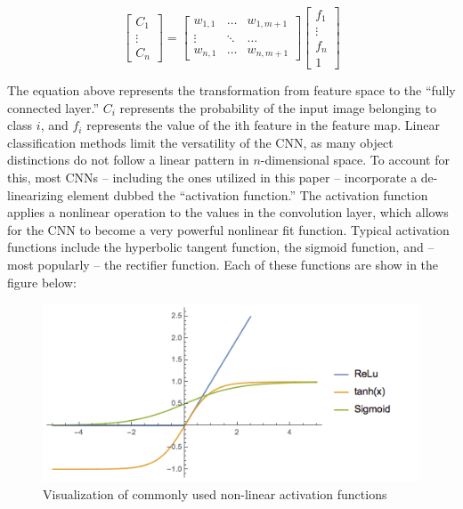 \documentclass[12pt]{drexelthesis}
\begin{document}
\begin{equation}
\begin{bmatrix}
C_{1} \\
\vdots \\
C_{n}
\end{bmatrix}  =  \begin{bmatrix} w_{1,1} & \hdots & w_{1,m+1} \\ \vdots & \ddots & \hdots \\ w_{n,1} & \hdots & w_{n, m+1} \end{bmatrix}  \begin{bmatrix} f_{1} \\ \vdots \\ f_{n} \\ 1 \end{bmatrix}
\end{equation}

The equation above represents the transformation from feature space to the “fully connected layer.” $C_{i}$ represents the probability of the input image belonging to class $i$, and $f_{i}$ represents the value of the ith feature in the feature map. 
Linear classification methods limit the versatility of the CNN, as many object distinctions do not follow a linear pattern in $n$-dimensional space. To account for this, most CNNs – including the ones utilized in this paper – incorporate a de-linearizing element dubbed the “activation function.” The activation function applies a nonlinear operation to the values in the convolution layer, which allows for the CNN to become a very powerful nonlinear fit function. Typical activation functions include the hyperbolic tangent function, the sigmoid function, and – most popularly – the rectifier function. Each of these functions are show in the figure below:

\begin{figure}[!ht]
\centering
\includegraphics[width=5in]{cnnReLu.png}
\caption[Common CNN non-linear activation functions]{\centering Visualization of commonly used non-linear activation functions}
\end{figure}
\end{document}
